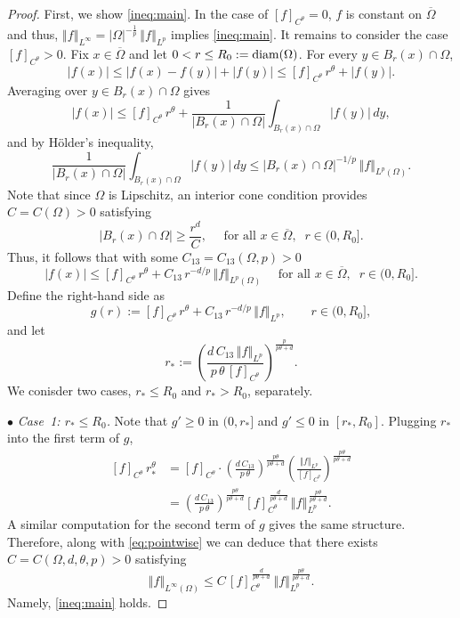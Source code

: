 \documentclass{amsart}
\numberwithin{equation}{section}
\newcommand{\norm}[1]{\left\Vert #1 \right\Vert}
\newcommand{\abs}[1]{\left| #1 \right|}
\begin{document}
\begin{proof}
First, we show \eqref{ineq:main}. In the case of  $[f]_{C^\theta} = 0$, $f$ is constant on $\overline\Omega$ and thus,
$
  \norm{f}_{L^\infty}
  = \abs{\Omega}^{-\frac{1}{p}}\,\norm{f}_{L^p}$ implies  \eqref{ineq:main}.
It remains to consider   the case $[f]_{C^\theta} > 0$.
Fix $x \in \overline\Omega$ and let $0 < r \leq R_0 := {\rm diam}(\Omega)$. For every $y \in B_r(x) \cap \Omega$,
\[
  \abs{f(x)}
  \leq \abs{f(x) - f(y)} + \abs{f(y)}
  \leq [f]_{C^\theta}\,r^\theta + \abs{f(y)}.
\]
Averaging over $y \in B_r(x) \cap \Omega$ gives
\[
  \abs{f(x)}
  \leq [f]_{C^\theta}\,r^\theta
  + \frac{1}{\abs{B_r(x) \cap \Omega}}\int_{B_r(x) \cap \Omega}\abs{f(y)}\,dy,
\]
and by H\"older's inequality,
\[
  \frac{1}{\abs{B_r(x) \cap \Omega}}\int_{B_r(x) \cap \Omega}\abs{f(y)}\,dy
  \leq \abs{B_r(x) \cap \Omega}^{-1/p}\,\norm{f}_{L^p(\Omega)}.
\]
Note that since $\Omega$ is Lipschitz, an interior cone condition provides $C= C(\Omega) > 0$ satisfying
\[
  \abs{B_r(x) \cap \Omega} \geq \frac{r^d}{C},
  \quad\mbox{ for all } x \in \overline\Omega,\;\;   r \in (0, R_0].
\]
Thus, it follows that with some $C_{13}=C_{13}(\Omega,p)>0$
\begin{equation}\label{eq:pointwise}
  \abs{f(x)} \leq [f]_{C^\theta}\,r^\theta + C_{13}\,r^{-d/p}\,\norm{f}_{L^p(\Omega)}   \quad\mbox{ for all } x \in \overline\Omega,\;\;   r \in (0, R_0].
\end{equation}
Define the right-hand side as
\[
  g(r) := [f]_{C^\theta}\,r^\theta + C_{13}\,r^{-d/p}\,\norm{f}_{L^p},
  \qquad r \in (0, R_0],
\]
and let 
\[
  r_* := \left(\frac{d\,C_{13}\,\norm{f}_{L^p}}{p\,\theta\,[f]_{C^\theta}}\right)^{\!\frac{p}{p\theta+d}}.
\]
We conisder two cases, $r_* \leq R_0$ and $r_* > R_0$, separately.

$\bullet$ \emph{Case~1: $r_* \leq R_0$.}
Note that $g'\ge0$ in $(0,r_{*}]$ and $g'\le0$ in $[r_{*},R_{0}]$.
Plugging $r_{*}$ into the first term of $g$,
\[
\begin{aligned}
  [f]_{C^\theta}\, r_*^\theta
  &= [f]_{C^\theta}\cdot\left(\frac{d\,C_{13}}{p\,\theta}\right)^{\!\frac{p\theta}{p\theta + d}}
  \left(\frac{\norm{f}_{L^p}}{[f]_{C^\theta}}\right)^{\!\frac{p\theta}{p\theta + d}}
  \\&= \left(\frac{d\,C_{13}}{p\,\theta}\right)^{\!\frac{p\theta}{p\theta + d}}
  [f]_{C^\theta}^{\,\frac{d}{p\theta + d}}\,\norm{f}_{L^p}^{\,\frac{p\theta}{p\theta + d}}.
\end{aligned} 
\]
A  similar computation for the second term of $g$ gives the same structure. Therefore, along with \eqref{eq:pointwise} we can deduce that there exists $C = C(\Omega, d, \theta, p) > 0$ satisfying
\begin{equation}\label{eq:case1}
  \norm{f}_{L^\infty(\Omega)}\leq C \, [f]_{C^\theta}^{\,\frac{d}{p\theta + d}}\,\norm{f}_{L^p}^{\,\frac{p\theta}{p\theta + d}}.
\end{equation}
Namely, \eqref{ineq:main} holds.


\end{proof}
\end{document}
